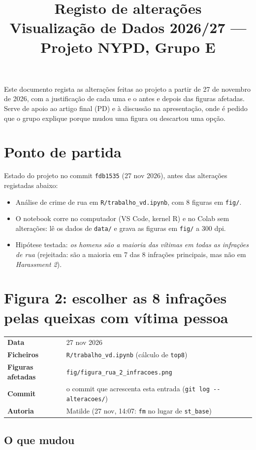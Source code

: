 \documentclass[11pt,a4paper]{article}
\title{\color{azul}\textbf{Registo de alterações}\\[4pt]
\large Visualização de Dados 2026/27 --- Projeto NYPD, Grupo E}
\date{}
\makeatletter
\newcommand{\ficha}[5]{%
  \begin{center}
  \colorbox{fundo}{\begin{minipage}{0.95\linewidth}\small
  \begin{tabular}{@{}p{3.2cm}p{11.8cm}@{}}
  \textbf{Data} & #1\\
  \textbf{Ficheiros} & #2\\
  \textbf{Figuras afetadas} & #3\\
  \textbf{Commit} & #4\\
  \textbf{Autoria} & #5\\
  \end{tabular}
  \end{minipage}}
  \end{center}}
\makeatother
\begin{document}
\maketitle

Este documento regista as alterações feitas ao projeto a partir de 27 de novembro de 2026,
com a justificação de cada uma e o antes e depois das figuras afetadas. Serve de apoio ao
artigo final (PD) e à discussão na apresentação, onde é pedido que o grupo explique porque
mudou uma figura ou descartou uma opção.

\tableofcontents

\section*{Ponto de partida}

Estado do projeto no commit \texttt{fdb1535} (27 nov 2026), antes das alterações registadas abaixo:

\begin{itemize}
  \item Análise de crime de rua em \texttt{R/trabalho\_vd.ipynb}, com 8 figuras em \texttt{fig/}.
  \item O notebook corre no computador (VS Code, kernel R) e no Colab sem alterações:
        lê os dados de \texttt{data/} e grava as figuras em \texttt{fig/} a 300 dpi.
  \item Hipótese testada: \emph{os homens são a maioria das vítimas em todas as infrações de rua}
        (rejeitada: são a maioria em 7 das 8 infrações principais, mas não em \textit{Harassment 2}).
\end{itemize}

\section{Figura 2: escolher as 8 infrações pelas queixas com vítima pessoa}

\ficha{27 nov 2026}
      {\texttt{R/trabalho\_vd.ipynb} (cálculo de \texttt{top8})}
      {\texttt{fig/figura\_rua\_2\_infracoes.png}}
      {o commit que acrescenta esta entrada (\texttt{git log -{}- alteracoes/})}
      {Matilde (27 nov, 14:07: \texttt{fm} no lugar de \texttt{st\_base})}

\subsection*{O que mudou}
\end{document}
